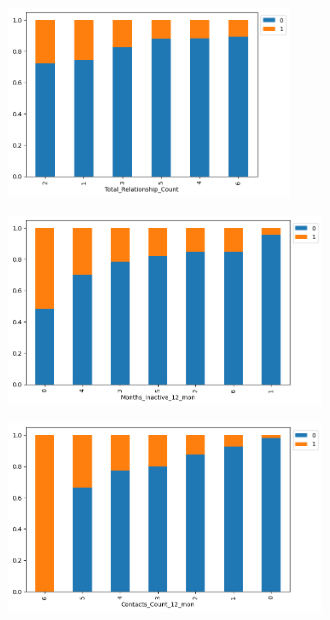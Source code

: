 \documentclass[10pt,a4paper]{style}
\begin{document}
	\begin{figure}[h]
		\centering
		\begin{subfigure}[t]{0.32\textwidth}
			\centering
			\includegraphics[width=\textwidth,height=5cm]{Attrition_Flag vs Total_Relationship_Count.png}
			\caption{}
			\label{fig:Attrition_Flag vs Total_Relationship_Count}
		\end{subfigure}
		\hfill
		\begin{subfigure}[t]{0.32\textwidth}
			\centering
			\includegraphics[width=\textwidth,height=5cm]{Attrition_Flag vs Months_Inactive_12_mon.png}
			\caption{}
			\label{fig:Attrition_Flag vs Months_Inactive_12_mon}
		\end{subfigure}
		\hfill
		\begin{subfigure}[t]{0.32\textwidth}
			\centering
			\includegraphics[width=\textwidth,height=5cm]{Attrition_Flag vs Contacts_Count_12_mon.png}
			\caption{}
			\label{fig:Attrition_Flag vs Contacts_Count_12_mon}
		\end{subfigure}
		\hfill
		\begin{subfigure}[t]{0.32\textwidth}

\end{subfigure}
\end{figure}
\end{document}
